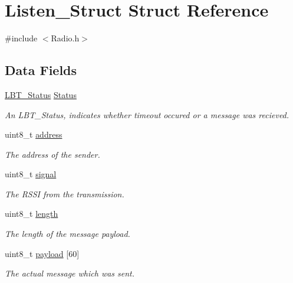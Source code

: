 \hypertarget{struct_listen___struct}{}\section{Listen\+\_\+\+Struct Struct Reference}
\label{struct_listen___struct}


{\ttfamily \#include $<$Radio.\+h$>$}

\subsection*{Data Fields}
\begin{DoxyCompactItemize}
\item 
\hyperlink{_radio_8h_a9ea8776ed870286764cea56e58956269}{L\+B\+T\+\_\+\+Status} \hyperlink{struct_listen___struct_ae616177a91ea7bd7140e1694f59ef4ea}{Status}
\begin{DoxyCompactList}\small\item\em An L\+B\+T\+\_\+\+Status, indicates whether timeout occured or a message was recieved. \end{DoxyCompactList}\item 
uint8\+\_\+t \hyperlink{struct_listen___struct_af3f726014b044194def151079f1f2d89}{address}
\begin{DoxyCompactList}\small\item\em The address of the sender. \end{DoxyCompactList}\item 
uint8\+\_\+t \hyperlink{struct_listen___struct_a7c1b70b404e83272e560887ddd8daf14}{signal}
\begin{DoxyCompactList}\small\item\em The R\+S\+S\+I from the transmission. \end{DoxyCompactList}\item 
uint8\+\_\+t \hyperlink{struct_listen___struct_ab2b3adeb2a67e656ff030b56727fd0ac}{length}
\begin{DoxyCompactList}\small\item\em The length of the message payload. \end{DoxyCompactList}\item 
uint8\+\_\+t \hyperlink{struct_listen___struct_a42f5829f7500fa6bbe09fa18aec20cb6}{payload} \mbox{[}60\mbox{]}
\begin{DoxyCompactList}\small\item\em The actual message which was sent. \end{DoxyCompactList}\end{DoxyCompactItemize}


